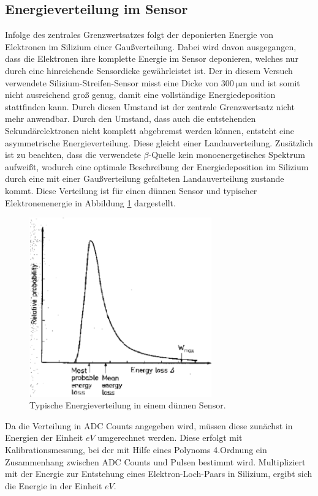 \subsection{Energieverteilung im Sensor}
Infolge des zentrales Grenzwertsatzes folgt der deponierten Energie von Elektronen im Silizium einer Gaußverteilung. Dabei wird davon ausgegangen, dass die Elektronen ihre komplette Energie im Sensor deponieren, welches nur durch eine hinreichende Sensordicke gewährleistet ist. Der in diesem Versuch verwendete Silizium-Streifen-Sensor misst eine Dicke von $\SI{300}{\micro\meter}$ und ist somit nicht ausreichend groß genug, damit eine vollständige Energiedeposition stattfinden kann. Durch diesen Umstand ist der zentrale Grenzwertsatz nicht mehr anwendbar. Durch den Umstand, dass auch die entstehenden Sekundärelektronen nicht komplett abgebremst werden können, entsteht eine asymmetrische Energieverteilung. Diese gleicht einer Landauverteilung. Zusätzlich ist zu beachten, dass die verwendete $\beta$-Quelle kein monoenergetisches Spektrum aufweißt, wodurch eine optimale Beschreibung der Energiedeposition im Silizium durch eine mit einer Gaußverteilung gefalteten Landauverteilung zustande kommt. Diese Verteilung ist für einen dünnen Sensor und typischer Elektronenenergie in Abbildung \ref{Verteilung} dargestellt.

\begin{figure}[H]
  \centering
  \includegraphics[width=0.7\textwidth]{ressources/Verteilung.png}
  \caption{Typische Energieverteilung in einem dünnen Sensor. \cite{skript}}
  \label{Verteilung}
\end{figure}


Da die Verteilung in ADC Counts angegeben wird, müssen diese zunächst in Energien der Einheit $eV$ umgerechnet werden. Diese erfolgt mit Kalibrationsmessung, bei der mit Hilfe eines Polynoms 4.Ordnung ein Zusammenhang zwischen ADC Counts und Pulsen bestimmt wird. Multipliziert mit der Energie zur Entstehung eines Elektron-Loch-Paars in Silizium, ergibt sich die Energie in der Einheit $eV$. 



